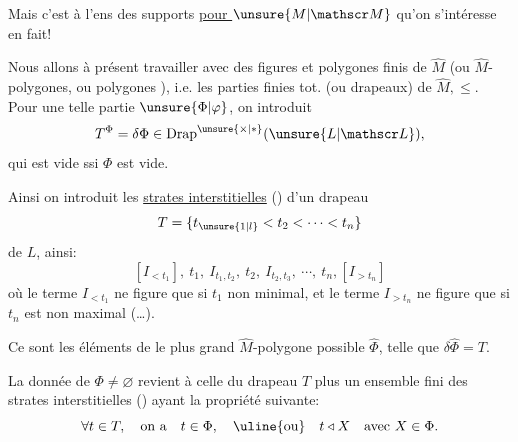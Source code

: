 Mais c'est à l'ens des supports \uline{pour $\unsure{M|\mathscr M}$} qu'on s'intéresse en fait!

Nous allons à présent travailler avec des figures et polygones finis de $\widehat M$ (ou $\widehat M$-polygones, ou polygones ), i.e. les parties finies tot.  (ou drapeaux) de $\widehat M,\leq$. Pour une telle partie $\unsure{\Phi|\varphi}$, on introduit
\[
T^{\Phi}=\delta\Phi\in\operatorname{Drap}^{\unsure{\times|*}}(\unsure{L|\mathscr L}),
\]
qui est vide ssi $\Phi$ est vide.

Ainsi on introduit les \uline{strates interstitielles} () d'un drapeau
\[
T=\{t_{\unsure{1|l}}<t_2<\cdots<t_n\}
\]
de $L$, ainsi: 
\[
[I_{<t_1}],\ t_1,\ I_{t_1,t_2},\ t_2,\ I_{t_2,t_3},\ \cdots,\ t_n,[I_{>t_n}]
\]
où le terme $I_{<t_1}$ ne figure que si $t_1$ non minimal, et le terme $I_{>t_n}$ ne figure que si $t_n$ est non maximal (\ldots).

Ce sont les éléments de le plus grand $\widehat M$-polygone possible $\widehat\Phi$, telle que $\delta\widehat\Phi=T$.

La donnée de  $\Phi\ne\varnothing$ revient à celle du drapeau $T$ plus un ensemble fini\inserted{$\Phi$,} des strates interstitielles () ayant la propriété suivante:
\[
\forall t\in T,\quad\text{on a}\quad t\in\Phi,\quad\uline{\text{ou}}\quad t\triangleleft X\quad\text{avec }X\in\Phi.
\]
